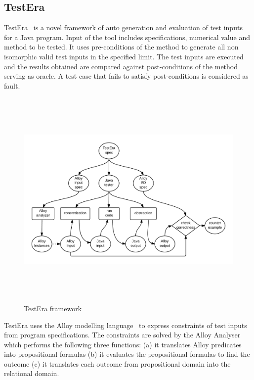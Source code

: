 \subsection{TestEra}
TestEra~\cite{marinov2001testera} is a novel framework of auto generation and evaluation of test inputs for a Java program. Input of the tool includes specifications, numerical value and method to be tested. It uses pre-conditions of the method to generate all non isomorphic valid test inputs in the specified limit. The test inputs are executed and the results obtained are compared against post-conditions of the method serving as oracle. A test case that fails to satisfy post-conditions is considered as fault. 
\bigskip
\begin{figure}[h]
	\centering
	\centerline{\includegraphics[width=15cm, height=10.9cm]{chapter2/TestEra.png}}
	\bigskip
	\caption{TestEra framework~\cite{marinov2001testera}}
	\label{fig:testera}
\end{figure}
\bigskip
TestEra uses the Alloy modelling language~\cite{jackson2001micromodularity} to express constraints of test inputs from program specifications. The constraints are solved by the Alloy Analyser~\cite{jackson2000alcoa} which performs the following three functions: (a) it translates Alloy predicates into propositional formulas%
 (b) it evaluates the propositional formulas to find the outcome (c) it translates each outcome from propositional domain into the relational domain.




